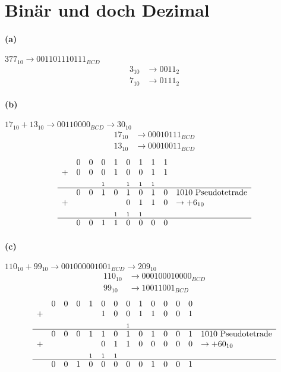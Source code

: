 \documentclass[a4paper]{article}
\begin{document}
\section{Binär und doch Dezimal}
\paragraph{(a)} $377_{10}\rightarrow 0011 0111 0111_{BCD}$
\begin{align*}
	3_{10}&\rightarrow 0011_2\\
	7_{10}&\rightarrow 0111_2
\end{align*}
\paragraph{(b)} $17_{10}+13_{10} \rightarrow 00110000_{BCD} \rightarrow 30_{10}$
\begin{align*}
	17_{10}&\rightarrow 00010111_{BCD}\\
	13_{10}&\rightarrow 00010011_{BCD}
\end{align*}
\begin{align*}
	\begin{array} {cccccccccl}
	&0&0&0&1&0&1&1&1& \\
	+&0&0&0&1&0&0&1&1& \\
	&&&_1&&_1&_1&_1&& \\
	\hline
	&0&0&1&0&1&0&1&0&1010 \text{ Pseudotetrade} \\
	+&&&&&0&1&1&0& \rightarrow +6_{10}\\
	&&&&_1&_1&_1&&& \\
	\hline
	&0&0&1&1&0&0&0&0& \\
	\end{array}
\end{align*}
\paragraph{(c)} $110_{10}+99_{10} \rightarrow 001000001001_{BCD} \rightarrow 209_{10}$
\begin{align*}
	110_{10}&\rightarrow 000100010000_{BCD}\\
	99_{10}&\rightarrow 10011001_{BCD}
\end{align*}
\begin{align*}
	\begin{array} {cccccccccccccl}
	&0&0&0&1&0&0&0&1&0&0&0&0& \\
	+&&&&&1&0&0&1&1&0&0&1& \\
	&&&&&&&_1&&&&&& \\
	\hline
	&0&0&0&1&1&0&1&0&1&0&0&1&1010 \text{ Pseudotetrade} \\
	+&&&&&0&1&1&0&0&0&0&0& \rightarrow +60_{10} \\
	&&&&_1&_1&_1&&&&&&& \\
	\hline
	&0&0&1&0&0&0&0&0&1&0&0&1& \\
	\end{array}
\end{align*}
\end{document}
